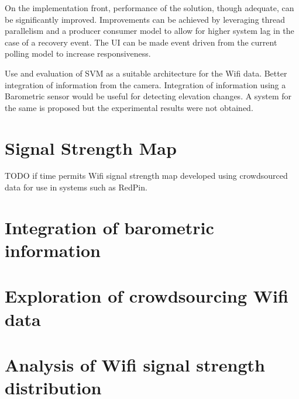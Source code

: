 On the implementation front, performance of the solution, though 
adequate, can be significantly improved.
Improvements can be achieved by leveraging thread parallelism and a 
producer consumer model to allow for higher system lag in the case of 
a recovery event. The UI can be made event driven from the current 
polling model to increase responsiveness.


Use and evaluation of SVM as a suitable architecture for the Wifi data.
Better integration of information from the camera.
Integration of information using a Barometric sensor would be useful for detecting elevation changes. A system for the same is proposed but the experimental results were not obtained. 


\section{Signal Strength Map}

TODO if time permits
Wifi signal strength map developed using crowdsourced data for use in systems such as RedPin.


\section{Integration of barometric information}

\section{Exploration of crowdsourcing Wifi data}

\section{Analysis of Wifi signal strength distribution}


